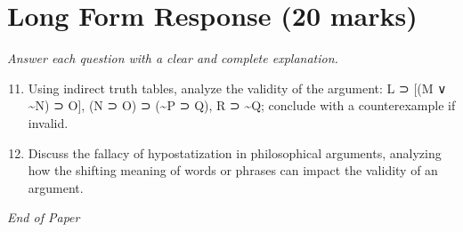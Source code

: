 \documentclass[12pt]{article}
\begin{document}
\section*{Long Form Response (20 marks)}
\textit{Answer each question with a clear and complete explanation.}
\begin{enumerate}[label=\arabic*.]
\setcounter{enumi}{10}
\item Using indirect truth tables, analyze the validity of the argument: L ⊃ [(M ∨ \textasciitilde{}N) ⊃ O], (N
⊃ O) ⊃ (\textasciitilde{}P ⊃ Q), R ⊃ \textasciitilde{}Q; conclude with a counterexample if invalid.
\item Discuss the fallacy of hypostatization in philosophical arguments, analyzing how the
shifting meaning of words or phrases can impact the validity of an argument.
\end{enumerate}

\vfill
\noindent\textit{End of Paper}
\end{document}

